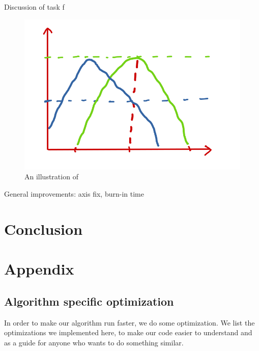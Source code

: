 \documentclass[reprint, english,notitlepage,nofootinbib]{revtex4-1}  %
\begin{document}
Discussion of task f
\begin{figure}
  \includegraphics[width=\linewidth]{../output/Drawing.png}
  \caption{An illustration of}
  \label{fig:drawing_critical_temp}
\end{figure}


General improvements: axis fix, burn-in time

\section{Conclusion}

\section{Appendix}
\subsection{Algorithm specific optimization}

In order to make our algorithm run faster, we do some optimization. We list the optimizations we implemented here, to make our code easier to understand and as a guide for anyone who wants to do something similar.
\end{document}
